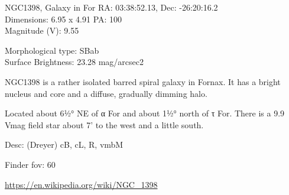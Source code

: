 \begin{block}{NGC1398, Galaxy in For}
    RA: 03:38:52.13, Dec: -26:20:16.2 \\ 
    Dimensions: 6.95 x 4.91 PA: 100 \\ 
    Magnitude (V): 9.55

    Morphological type: SBab \\ 
    Surface Brightness: 23.28 mag/arcsec2

    NGC1398 is a rather isolated barred spiral galaxy in Fornax. It has a
    bright nucleus and core and a diffuse, gradually dimming halo.

    Located about 6½° NE of α For and about 1½° north of τ For. There is a 9.9
    Vmag field star about 7' to the west and a little south.

    Desc: (Dreyer) cB, cL, R, vmbM 

    Finder fov: 60 

    \url{https://en.wikipedia.org/wiki/NGC_1398} 
\end{block}
